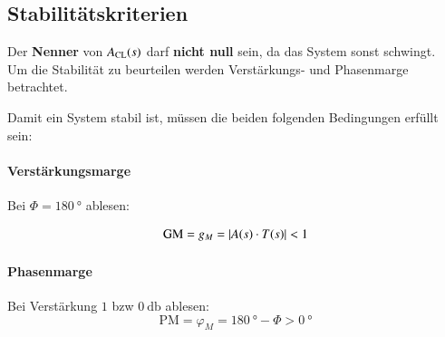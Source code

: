


\subsection{Stabilitätskriterien}
Der \textbf{Nenner} von $A_{\rm CL}(s)$ darf \textbf{nicht null} sein, da das System sonst schwingt. \\
Um die Stabilität zu beurteilen werden Verstärkungs- und Phasenmarge betrachtet.

\medskip

Damit ein System stabil ist, müssen die beiden folgenden Bedingungen erfüllt sein:

\smallskip

\begin{minipage}[t]{0.48\columnwidth}
    \paragraph{Verstärkungsmarge}

    Bei $\Phi = \qty{180}{\degree}$ ablesen:

    \[
        \text{GM} = g_M = \left|A(s) \cdot T(s)\right| < 1
    \]

    \smallskip

    \paragraph{Phasenmarge}

    Bei Verstärkung $1$ bzw  $\qty{0}{\decibel}$ ablesen:
    \[
        \text{PM} = \varphi_M = \qty{180}{\degree} - \Phi > \qty{0}{\degree}
    \]
\end{minipage}
\hfill
